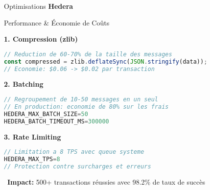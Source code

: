 \documentclass[aspectratio=169,11pt]{beamer}
\newcommand{\hedera}{\textbf{Hedera}\texttrademark}
\begin{document}
\begin{frame}[fragile]{Optimisations \hedera}

\begin{block}{Performance \& Économie de Coûts}
\vspace{0.2cm}

\textbf{1. Compression (zlib)}
\begin{lstlisting}[language=JavaScript]
// Reduction de 60-70% de la taille des messages
const compressed = zlib.deflateSync(JSON.stringify(data));
// Economie: $0.06 -> $0.02 par transaction
\end{lstlisting}

\vspace{0.2cm}

\textbf{2. Batching}
\begin{lstlisting}[language=JavaScript]
// Regroupement de 10-50 messages en un seul
// En production: economie de 80% sur les frais
HEDERA_MAX_BATCH_SIZE=50
HEDERA_BATCH_TIMEOUT_MS=300000
\end{lstlisting}

\vspace{0.2cm}

\textbf{3. Rate Limiting}
\begin{lstlisting}[language=JavaScript]
// Limitation a 8 TPS avec queue systeme
HEDERA_MAX_TPS=8
// Protection contre surcharges et erreurs
\end{lstlisting}
\end{block}

\begin{center}
\large{\textcolor{successGreen}{\faChartLine~\textbf{Impact:} 500+ transactions réussies avec 98.2\% de taux de succès}}
\end{center}

\end{frame}
\end{document}
